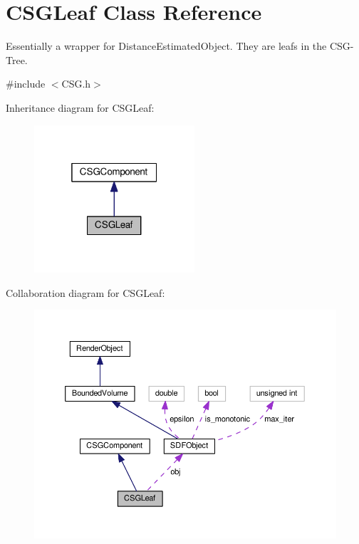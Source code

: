 \hypertarget{classCSGLeaf}{}\section{C\+S\+G\+Leaf Class Reference}
\label{classCSGLeaf}


Essentially a wrapper for Distance\+Estimated\+Object. They are leafs in the C\+S\+G-\/\+Tree.  




{\ttfamily \#include $<$C\+S\+G.\+h$>$}



Inheritance diagram for C\+S\+G\+Leaf\+:\nopagebreak
\begin{figure}[H]
\begin{center}
\leavevmode
\includegraphics[width=169pt]{classCSGLeaf__inherit__graph}
\end{center}
\end{figure}


Collaboration diagram for C\+S\+G\+Leaf\+:
\nopagebreak
\begin{figure}[H]
\begin{center}
\leavevmode
\includegraphics[width=350pt]{classCSGLeaf__coll__graph}
\end{center}
\end{figure}
